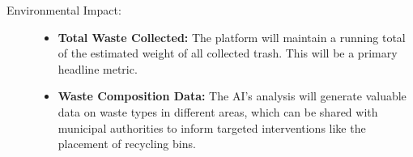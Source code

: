{\begin{description}
		\item[Environmental Impact:]

		      \begin{itemize}
			      \item \textbf{Total Waste Collected:} The platform will maintain a running total of the estimated weight of all collected trash. This will be a primary headline metric.

			      \item \textbf{Waste Composition Data:} The AI's analysis will generate valuable data on waste types in different areas, which can be shared with municipal authorities to inform targeted interventions like the placement of recycling bins.
		      \end{itemize}
	\end{description}
}
